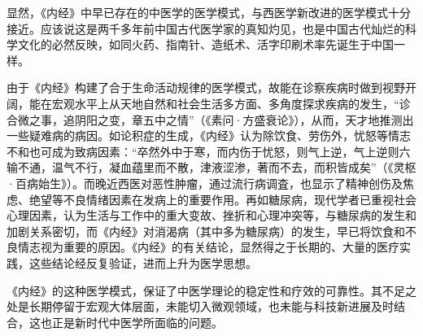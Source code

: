 \documentclass[12pt]{ctexbook}
\begin{document}
显然，《内经》中早已存在的中医学的医学模式，与西医学新改进的医学模式十分接近。应该说这是两千多年前中国古代医学家的真知灼见，也是中国古代灿烂的科学文化的必然反映，如同火药、指南针、造纸术、活字印刷术率先诞生于中国一样。

由于《内经》构建了合于生命活动规律的医学模式，故能在诊察疾病时做到视野开阔，能在宏观水平上从天地自然和社会生活多方面、多角度探求疾病的发生，“诊合微之事，追阴阳之变，章五中之情”（《素问·方盛衰论》），从而，天才地推测出一些疑难病的病因。如论积症的生成，《内经》认为除饮食、劳伤外，忧怒等情志不和也可成为致病因素：“卒然外中于寒，而内伤于忧怒，则气上逆，气上逆则六输不通，温气不行，凝血蕴里而不散，津液涩渗，著而不去，而积皆成矣”（《灵枢·百病始生》）。而晚近西医对恶性肿瘤，通过流行病调査，也显示了精神创伤及焦虑、绝望等不良情绪因素在发病上的重要作用。再如糖尿病，现代学者已重视社会心理因素，认为生活与工作中的重大变故、挫折和心理冲突等，与糖尿病的发生和加剧关系密切，而《内经》对消渴病（其中多为糖尿病）的发生，早已将饮食和不良情志视为重要的原因。《内经》的有关结论，显然得之于长期的、大量的医疗实践，这些结论经反复验证，进而上升为医学思想。

《内经》的这种医学模式，保证了中医学理论的稳定性和疗效的可靠性。其不足之处是长期停留于宏观大体层面，未能切入微观领域，也未能与科技新进展及时结合，这也正是新时代中医学所面临的问题。

\ifx \allfiles \undefined
\end{document}
